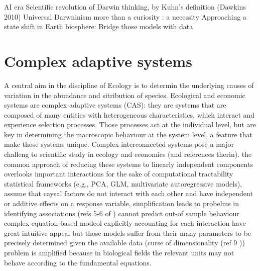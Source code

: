 \begin{outline}
        \2 AI era
        \2 Scientific revolution of Darwin thinking, by Kuhn's definition (Dawkins 2010)
        \2 Universal Darwninism
    \1 more than a curiosity : a necessity
        \2 Approaching a state shift in Earth biosphere: \cite{Barnosky2012}
    \1 Bridge those models with data
\end{outline}


\section{Complex adaptive systems}
\label{sec:intro:cas}
\begin{outline}
    \1 A central aim in the discipline of Ecology is to determin the underlying causes of variation in the abundance and sitribution of species.
    \1 Ecological and economic systems are complex adaptive systems (CAS): they are systems that are composed of many entities with heterogeneous characteristics, which interact and experience selection processes. Those processes act at the individual level, but are key in determining the macroscopic behaviour at the system level, a feature that make those systems unique.
    \1 Complex interconnected systems pose a major challeng to scientific study in ecology and economics \cite{Ye2016} (and references therin).
        \2 the common approach of reducing these systems to linearly independent components overlooks important interactions for the sake of computational tractability 
        \2 statistical frameworks (e.g., PCA, GLM, multivariate autoregressive models), assume that caysal factors do not interact with each other and have independent or additive effects on a response variable,
            \3 simplification leads to probelms in identifying associations (refs 5-6 of \cite{Ye2016})
            \3 cannot predict out-of sample behaviour
        \2 complex equation-based modeol explicitly accounting for each interaction have great intuitive appeal 
            \3 but those models suffer from their many parameters to be precisely determined given the available data (curse of dimensionality (ref 9 \cite{Ye2016}))
            \3 problem is amplified because in biological fields the relevant units may not behave according to the fundamental equations.
\end{outline}
